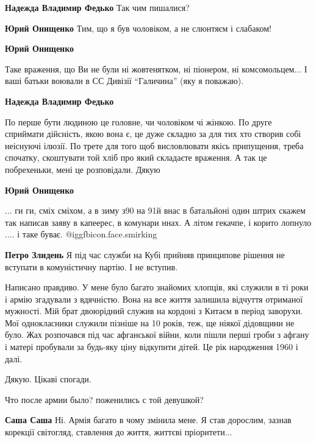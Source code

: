 \begin{itemize}
\begin{itemize}
\begin{itemize}
\textbf{Надежда Владимир Федько} Так чим пишалися?

\textbf{Юрий Онищенко} Тим, що я був чоловіком, а не слюнтяєм і слабаком!

\textbf{Юрий Онищенко} 

Таке враження, що Ви не були ні жовтенятком, ні піонером, ні комсомольцем... І
ваші батьки воювали в СС Дивізії \enquote{Галичина} (яку я поважаю).

\textbf{Надежда Владимир Федько} 

По перше бути людиною це головне, чи чоловіком чі жінкою. По друге сприймати
дійсність, якою вона є, це дуже складно за для тих хто створив собі неіснуючі
ілюзії. По трете для того щоб висловлювати якісь припущення, треба спочатку,
скоштувати той хліб про який складаєте враження. А так це побрехеньки, мені це
розповідали. Дякую

\textbf{Юрий Онищенко} 

... ги ги, сміх сміхом, а в зиму з90 на 91й внас в батальйоні один штрих
скажем так написав заяву в капеерес, в комунари ннах. А літом гекачпе, і
корито лопнуло .... і таке буває. @igg{fbicon.face.smirking} 

\textbf{Петро Злидень} Я під час служби на Кубі прийняв принципове рішення не вступати в комуністичну партію. І не вступив.
\end{itemize} %


Написано правдиво. У мене було багато знайомих хлопців, які служили в ті роки і
армію згадували з вдячністю. Вона на все життя залишила відчуття отриманої
мужності. Мій брат двоюрідний служив на кордоні з Китаєм в період заворухи. Мої
однокласники служили пізніше на 10 років, теж, ще ніякої дідовщини не було. Жах
розпочався під час афганської війни, коли пішли перші гроби з афгану і матері
пробували за будь-яку ціну відкупити дітей. Це рік народження 1960 і далі.

\end{itemize} %

Дякую. Цікаві спогади.

Что после армии было? поженились с той девушкой?

\begin{itemize} %
\textbf{Саша Саша} Ні. Армія багато в чому змінила мене. Я став дорослим, зазнав корекції світогляд, ставлення до життя, життєві пріоритети...
\end{itemize} %


\end{itemize}
